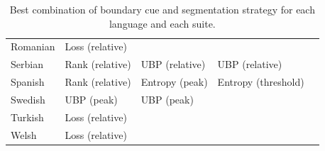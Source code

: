 \begin{table}[t]
\begin{tabular}{lllll}
    Romanian & Loss (relative) &  &  &  \\
    Serbian & Rank (relative) & UBP (relative) & UBP (relative) &  \\
    Spanish & Rank (relative) & Entropy (peak) & Entropy (threshold) &  \\
    Swedish & UBP (peak) & UBP (peak) &  &  \\
    Turkish & Loss (relative) &  &  &  \\
    Welsh & Loss (relative) &  &  &  \\
    \bottomrule
    \end{tabular}
    \caption{Best combination of boundary cue and segmentation strategy for each language and each suite.}
    \label{tab:15-bestcuesfull}
\end{table}
